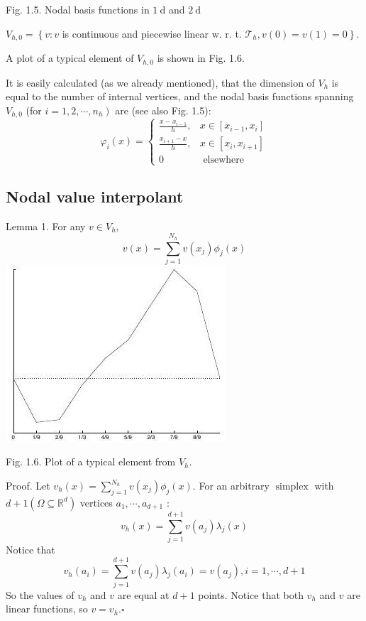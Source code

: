\documentclass[10pt]{article}
\begin{document}
Fig. 1.5. Nodal basis functions in $1 \mathrm{~d}$ and $2 \mathrm{~d}$

$V_{h, 0}=\left\{v: v\right.$ is continuous and piecewise linear w. r. t. $\left.\mathcal{T}_{h}, v(0)=v(1)=0\right\} .$

A plot of a typical element of $V_{h, 0}$ is shown in Fig. 1.6.

It is easily calculated (as we already mentioned), that the dimension of $V_{h}$ is equal to the number of internal vertices, and the nodal basis functions spanning $V_{h, 0}$ (for $\left.i=1,2, \cdots, n_{h}\right)$ are (see also Fig. 1.5):
$$
\varphi_{i}(x)=\left\{\begin{array}{cl}
\frac{x-x_{i-1}}{h}, & x \in\left[x_{i-1}, x_{i}\right] \\
\frac{x_{i+1}-x}{h}, & x \in\left[x_{i}, x_{i+1}\right] \\
0 & \text { elsewhere }
\end{array}\right.
$$

\subsection{Nodal value interpolant}
Lemma 1. For any $v \in V_{h}$,
$$
v(x)=\sum_{j=1}^{N_{h}} v\left(x_{j}\right) \phi_{j}(x)
$$
\includegraphics[max width=\textwidth]{2022_01_05_15c63bf4a948497c30d9g-10}

Fig. 1.6. Plot of a typical element from $V_{h}$.

Proof. Let $v_{h}(x)=\sum_{j=1}^{N_{h}} v\left(x_{j}\right) \phi_{j}(x) .$ For an arbitrary $\operatorname{simplex}$ with $d+1\left(\Omega \subseteq \mathbb{R}^{d}\right)$ vertices $a_{1}, \cdots, a_{d+1}$ :
$$
v_{h}(x)=\sum_{j=1}^{d+1} v\left(a_{j}\right) \lambda_{j}(x)
$$
Notice that
$$
v_{h}\left(a_{i}\right)=\sum_{j=1}^{d+1} v\left(a_{j}\right) \lambda_{j}\left(a_{i}\right)=v\left(a_{j}\right), i=1, \cdots, d+1
$$
So the values of $v_{h}$ and $v$ are equal at $d+1$ points. Notice that both $v_{h}$ and $v$ are linear functions, so $v=v_{h} . \square$
\end{document}
